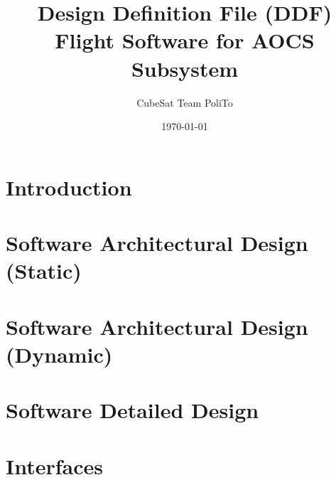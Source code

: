 \documentclass[11pt, a4paper]{report}
\title{
\vspace*{-2cm} %
{\Huge \textbf{Design Definition File (DDF)}}\\[0.5cm]
{\LARGE Flight Software for AOCS Subsystem}
}
\author{CubeSat Team PoliTo}
\date{\today}
\begin{document}
\maketitle
\thispagestyle{fancy} %

\tableofcontents
\listoffigures
\listoftables

\chapter{Introduction}


\chapter{Software Architectural Design (Static)}


\chapter{Software Architectural Design (Dynamic)}


\chapter{Software Detailed Design}


\chapter{Interfaces}

\end{document}
